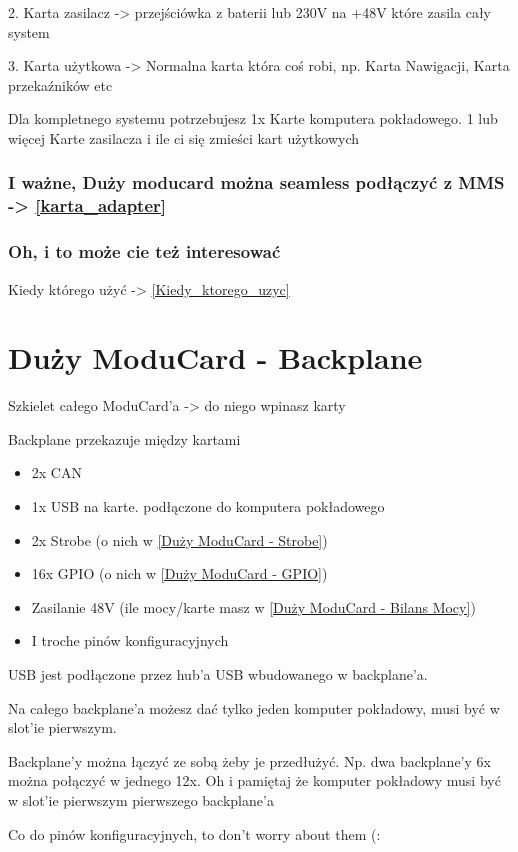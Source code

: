 \documentclass[b5paper, 10pt, twoside]{book}
\begin{document}
2. Karta zasilacz -> przejściówka z baterii lub 230V na +48V które zasila cały system

3. Karta użytkowa -> Normalna karta która coś robi, np. Karta Nawigacji, Karta przekaźników etc

Dla kompletnego systemu potrzebujesz 1x Karte komputera pokładowego. 1 lub więcej Karte zasilacza i ile ci się zmieści kart użytkowych 

\subsubsection{I ważne, Duży moducard można seamless podłączyć z MMS -> \ref{karta_adapter}}
\subsubsection{Oh, i to może cie też interesować}
Kiedy którego użyć -> \ref{Kiedy_ktorego_uzyc}

\section{Duży ModuCard - Backplane}
Szkielet całego ModuCard'a -> do niego wpinasz karty


Backplane przekazuje między kartami
\begin{itemize}
  \item 2x CAN
  \item 1x USB na karte. podłączone do komputera pokładowego
  \item 2x Strobe (o nich w \ref{Duży ModuCard - Strobe})
  \item 16x GPIO (o nich w \ref{Duży ModuCard -  GPIO})
  \item Zasilanie 48V (ile mocy/karte masz w \ref{Duży ModuCard - Bilans Mocy})
  \item I troche pinów konfiguracyjnych
\end{itemize}

USB jest podłączone przez hub'a USB wbudowanego w backplane'a.

Na całego backplane'a możesz dać tylko jeden komputer pokładowy, musi być w slot'ie pierwszym.

Backplane'y można łączyć ze sobą żeby je przedłużyć. Np. dwa backplane'y 6x można połączyć w jednego 12x. Oh i pamiętaj że komputer pokładowy musi być w slot'ie pierwszym pierwszego backplane'a

Co do pinów konfiguracyjnych, to don't worry about them (:
\end{document}
